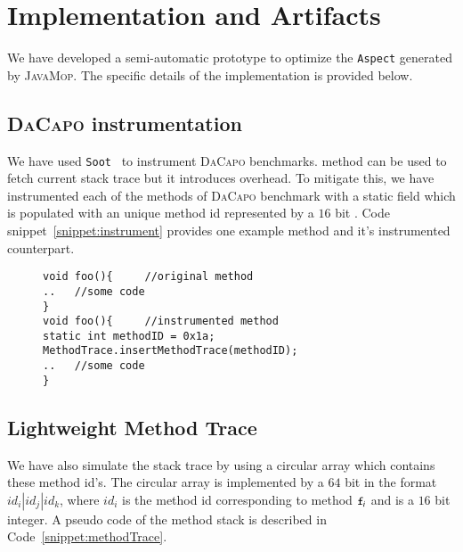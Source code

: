 \section{Implementation and Artifacts}
\label{sec:implementation}

We have developed a semi-automatic prototype to optimize the \texttt{Aspect}
generated by \textsc{JavaMop}. The specific details of the implementation is
provided below.



\subsection{\textsc{DaCapo} instrumentation} 
\label{subsec:dacapoInstr}

We have used \texttt{Soot}~\cite{soot} to
instrument \textsc{DaCapo} benchmarks.  method can be used to
fetch current stack trace but it introduces overhead. To mitigate this, we have
instrumented each of the methods of \textsc{DaCapo} benchmark with a static
 field which is populated with an unique method id represented by
a $16$ bit . Code snippet~\ref{snippet:instrument} provides one
example method and it's instrumented counterpart.

 \begin{figure}[t]
\begin{lstlisting}
void foo(){		//original method
..   //some code
}
void foo(){		//instrumented method
static int methodID = 0x1a;
MethodTrace.insertMethodTrace(methodID);
..   //some code
}
\end{lstlisting}
\end{figure}

\subsection{Lightweight Method Trace}
\label{subsec:trace}

We have also simulate the stack trace by using a
circular array which contains these method id's. The circular array is
implemented by a $64$ bit  in the format $id_i|id_j|id_k$, where
$id_i$ is the method id corresponding to method $\code{f}_i$ and is a $16$ bit
integer. A pseudo code of the method stack is described in
Code~\ref{snippet:methodTrace}.

